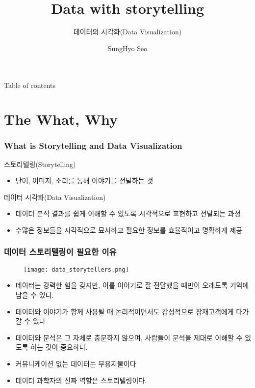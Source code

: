\documentclass[10pt]{beamer}
\title{\textbf{Data with storytelling}}
\subtitle{데이터의 시각화(Data Visualization)}
\author{SungHyo Seo}
\institute{Department of Information and Statistics}
\begin{document}
\maketitle

	\begin{frame}{Table of contents}
 		\tableofcontents
	\end{frame}

	\section{The What, Why}
	\begin{frame}
	\frametitle{What is Storytelling and Data Visualization}
		\begin{block}{스토리텔링(Storytelling)}
			\begin{itemize}
				\item 단어, 이미지, 소리를 통해 이야기를 전달하는 것
			\end{itemize}
		\end{block}
		\begin{block}{데이터 시각화(Data Visualization)}
			\begin{itemize}
				\item 데이터 분석 결과를 쉽게 이해할 수 있도록 시각적으로 표현하고 전달되는 과정
				\item 수많은 정보들을 시각적으로 묘사하고 필요한 정보를 효율적이고 명확하게 제공
			\end{itemize}
		\end{block}
	\end{frame}

	\begin{frame}
	\frametitle{데이터 스토리텔링이 필요한 이유}
		\begin{figure}
			\texttt{[image: data\_storytellers.png]}
		\end{figure}
	\begin{itemize}
		\item 데이터는 강력한 힘을 갖지만, 이를 이야기로 잘 전달했을 때만이 오래도록 기억에 남을 수 있다.
		\item 데이터와 이야기가 함께 사용될 때 논리적이면서도 감성적으로 잠재고객에게 다가갈 수 있다
		\item 데이터와 분석은 그 자체로 충분하지 않으며, 사람들이 분석을 제대로 이해할 수 있도록 하는 것이 중요하다.
		\item 커뮤니케이션 없는 데이터는 무용지물이다
		\item 데이터 과학자의 진짜 역할은 스토리텔링이다.
	\end{itemize}
	\end{frame}
\end{document}
